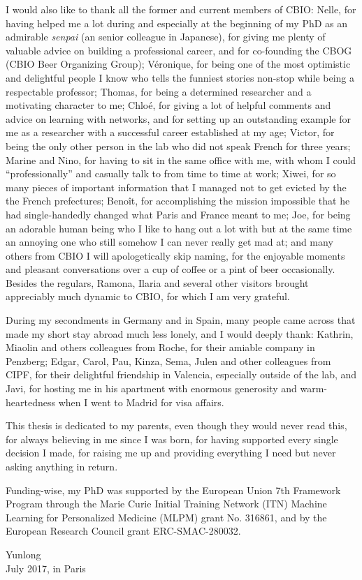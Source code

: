 I would also like to thank all the former and current members of CBIO: Nelle, for having helped me a lot during and especially at the beginning of my PhD as an admirable \textit{senpai} (an senior colleague in Japanese), for giving me plenty of valuable advice on building a professional career, and for co-founding the CBOG (CBIO Beer Organizing Group); V\'{e}ronique, for being one of the most optimistic and delightful people I know who tells the funniest stories non-stop while being a respectable professor; Thomas, for being a determined researcher and a motivating character to me; Chlo\'{e}, for giving a lot of helpful comments and advice on learning with networks, and for setting up an outstanding example for me as a researcher with a successful career established at my age; Victor, for being the only other person in the lab who did not speak French for three years; Marine and Nino, for having to sit in the same office with me, with whom I could ``professionally'' and casually talk to from time to time at work; Xiwei, for so many pieces of important information that I managed not to get evicted by the the French prefectures; Beno\^{i}t, for accomplishing the mission impossible that he had single-handedly changed what Paris and France meant to me; Joe, for being an adorable human being who I like to hang out a lot with but at the same time an annoying one who still somehow I can never really get mad at; and many others from CBIO I will apologetically skip naming, for the enjoyable moments and pleasant conversations over a cup of coffee or a pint of beer occasionally. Besides the regulars, Ramona, Ilaria and several other visitors brought appreciably much dynamic to CBIO, for which I am very grateful.


During my secondments in Germany and in Spain, many people came across that made my short stay abroad much less lonely, and I would deeply thank: Kathrin, Miaolin and others colleagues from Roche, for their amiable company in Penzberg; Edgar, Carol, Pau, Kinza, Sema, Julen and other colleagues from CIPF, for their delightful friendship in Valencia, especially outside of the lab, and Javi, for hosting me in his apartment with enormous generosity and warm-heartedness when I went to Madrid for visa affairs.


This thesis is dedicated to my parents, even though they would never read this, for always believing in me since I was born, for having supported every single decision I made, for raising me up and providing everything I need but never asking anything in return.


Funding-wise, my PhD was supported by the European Union 7th Framework Program through the Marie Curie Initial Training Network (ITN) Machine Learning for Personalized Medicine (MLPM) grant No. 316861, and by the European Research Council grant ERC-SMAC-280032.


\begin{flushright}
Yunlong
\\
July 2017, in Paris
\end{flushright}
